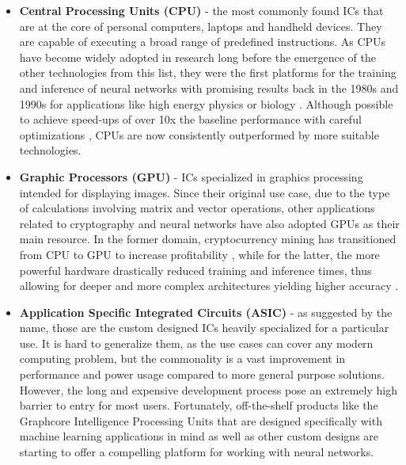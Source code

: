 \begin{itemize}
  \item \textbf{Central Processing Units (CPU)} - the most commonly found ICs that are at the core of personal computers, laptops and handheld devices. They are capable of executing a broad range of predefined instructions. As CPUs have become widely adopted in research long before the emergence of the other technologies from this list, they were the first platforms for the training and inference of neural networks with promising results back in the 1980s and 1990s for applications like high energy physics \cite{17-dagli1989applications} or biology \cite{16-wu1995neural}. Although possible to achieve speed-ups of over 10x the baseline performance with careful optimizations \cite{nn_cpu_optim}, CPUs are now consistently outperformed by more suitable technologies.

  \item \textbf{Graphic Processors (GPU)} - ICs specialized in graphics processing intended for displaying images. Since their original use case, due to the type of calculations involving matrix and vector operations, other applications related to cryptography and neural networks have also adopted GPUs as their main resource. In the former domain, cryptocurrency mining has transitioned from CPU to GPU to increase profitability \cite{19-iyer2018gpu}, while for the latter, the more powerful hardware drastically reduced training and inference times, thus allowing for deeper and more complex architectures yielding higher accuracy \cite{20-chen2020gpu-accelerated, 21-zhang2019recent}.

  \item \textbf{Application Specific Integrated Circuits (ASIC)} - as suggested by the name, those are the custom designed ICs heavily specialized for a particular use. It is hard to generalize them, as the use cases can cover any modern computing problem, but the commonality is a vast improvement in performance and power usage compared to more general purpose solutions. However, the long and expensive development process pose an extremely high barrier to entry for most users. Fortunately, off-the-shelf products like the Graphcore Intelligence Processing Units \cite{22-graphcoregraphcore} that are designed specifically with machine learning applications in mind as well as other custom designs \cite{23-knag2015sparse, 24-ramanaiah2011asic} are starting to offer a compelling platform for working with neural networks.


\end{itemize}
